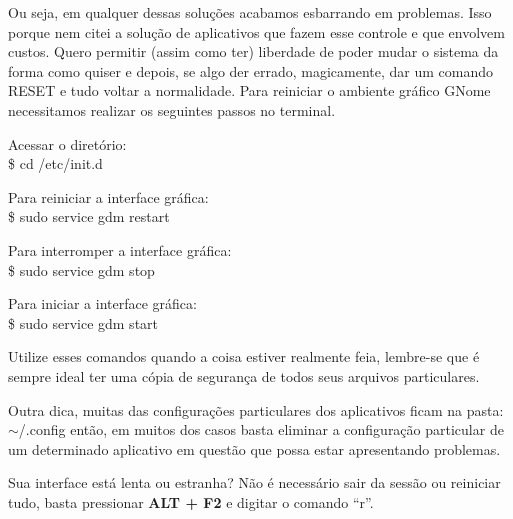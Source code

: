 Ou seja, em qualquer dessas soluções acabamos esbarrando em problemas. Isso porque nem citei a solução de aplicativos que fazem esse controle e que envolvem custos. Quero permitir (assim como ter) liberdade de poder mudar o sistema da forma como quiser e depois, se algo der errado, magicamente, dar um comando RESET e tudo voltar a normalidade. Para reiniciar o ambiente gráfico GNome necessitamos realizar os seguintes passos no terminal.

Acessar o diretório: \\
{\ttfamily\$ cd /etc/init.d}

Para reiniciar a interface gráfica: \\
{\ttfamily\$ sudo service gdm restart}

Para interromper a interface gráfica: \\
{\ttfamily\$ sudo service gdm stop}

Para iniciar a interface gráfica: \\
{\ttfamily\$ sudo service gdm start}
\\[3mm]
\begin{dica} Utilize esses comandos quando a coisa estiver realmente feia, lembre-se que é sempre ideal ter uma cópia de segurança de todos seus arquivos particulares. 

Outra dica, muitas das configurações particulares dos aplicativos ficam na pasta: $\sim$/.config então, em muitos dos casos basta eliminar a configuração particular de um determinado aplicativo em questão que possa estar apresentando problemas.
\end{dica}

Sua interface está lenta ou estranha? Não é necessário sair da sessão ou reiniciar tudo, basta pressionar \textbf{ALT + F2} e digitar o comando ``r''.

